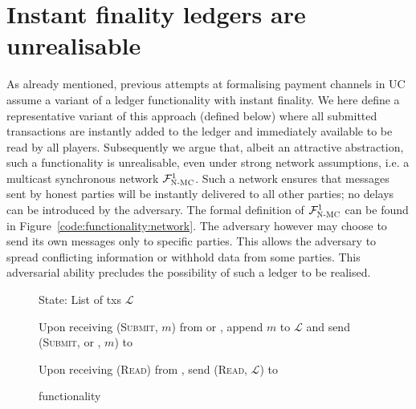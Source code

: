 \section{Instant finality ledgers are unrealisable}
\label{sec:perfect-ledger}
  As already mentioned, previous attempts at formalising payment channels in
  UC~\cite{DBLP:conf/ccs/DziembowskiFH18,Malavolta:2017:CPP:3133956.3134096,sprites,perun}
  assume a variant of a ledger functionality with instant finality. We here
  define a representative variant of this approach \perfectledger{} (defined
  below) where all submitted transactions are instantly added to the ledger and
  immediately available to be read by all players. Subsequently we argue that,
  albeit an attractive abstraction, such a functionality is unrealisable, even
  under strong network assumptions, i.e. a multicast synchronous network
  $\mathcal{F}_{\textsc{N-MC}}^1$. Such a network ensures that messages sent by honest parties
  will be instantly delivered to all other parties; no delays can be introduced
  by the adversary. The formal definition of $\mathcal{F}_{\textsc{N-MC}}^1$ can be found in
  Figure~\ref{code:functionality:network}. The
  adversary however may choose to send its own messages only to specific
  parties. This allows the adversary to spread conflicting information or
  withhold data from some parties. This adversarial ability precludes the
  possibility of such a ledger to be realised.

 \begin{figure}[H]
    \begin{systembox}{\perfectledger}
      \begin{algorithmic}[1]
        \State State: List of txs $\mathcal{L}$
        \Statex

        \State Upon receiving (\textsc{Submit}, $m$) from \alice{} or
        \adversary, append $m$ to $\mathcal{L}$ and send (\textsc{Submit},
        \alice{} or \adversary, $m$) to \adversary
        \Statex

        \State Upon receiving (\textsc{Read}) from \alice, send (\textsc{Read},
        $\mathcal{L}$) to \alice
      \end{algorithmic}
    \end{systembox}
    \caption{\perfectledger functionality}
    \label{fig:perfectledger:func}
  \end{figure}


